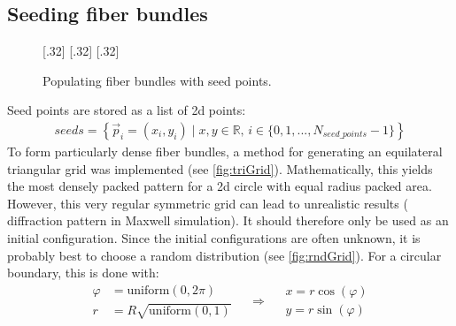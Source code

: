 \subsection{Seeding fiber bundles}\label{sec:seeds}
%
\begin{figure}[!t]
    \def\tikzheight{0.25\textwidth}
    \centering
    [.32\textwidth]{
    }
    \hfill
    [.32\textwidth]{
    }
    \hfill
    [.32\textwidth]{
    }
	\caption{Populating fiber bundles with seed points.}
\end{figure}
%
Seed points are stored as a list of 2d points:
\begin{align}
\mathit{seeds} = \left\{ \vec{p}_i=(x_i,y_i) \mid x,y \in \mathbb{R} , \, i \in \{0,1,...,N_{\mathit{seed\_points}}-1\}\right\}
\end{align}
%
To form particularly dense fiber bundles, a method for generating an equilateral triangular grid was implemented (see \ref{fig:triGrid}).
Mathematically, this yields the most densely packed pattern for a 2d circle with equal radius packed area.
However, this very regular symmetric grid can lead to unrealistic results (\eg{} diffraction pattern in Maxwell simulation).
It should therefore only be used as an initial configuration.
Since the initial configurations are often unknown, it is probably best to choose a random distribution (see \cref{fig:rndGrid}).
For a circular boundary, this is done with:
% 
\begin{equation}
\begin{split}
\varphi &= \mathrm{uniform}(0,2 \pi) \\
r &= R \sqrt{\mathrm{uniform}(0,1)}
\end{split}
\quad\Rightarrow\quad
\begin{split}
x = r \cos(\varphi)\\
y = r \sin(\varphi)
\end{split}
\end{equation}
%
%
%
